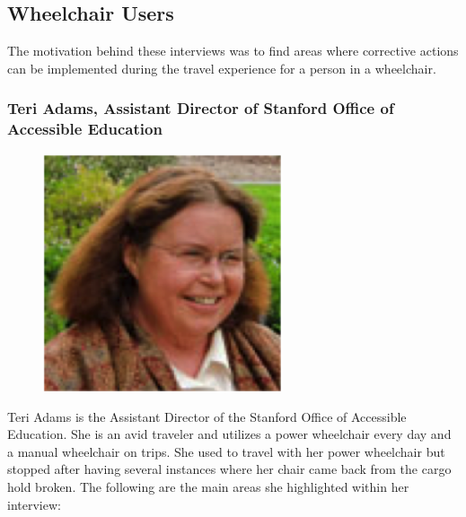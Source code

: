 \documentclass[a4paper, 12pt,conference]{new_cit_thesis}
\begin{document}
\subsection*{Wheelchair Users}
The motivation behind these interviews was to find areas where corrective actions can be implemented during the travel experience for a person in a wheelchair.

\subsubsection{Teri Adams, Assistant Director of Stanford Office of Accessible Education}
\begin{figure}[h]
  \centering
     \includegraphics[width=7cm]{images/image022}
  \label{fig:22}
\end{figure}

Teri Adams is the Assistant Director of the Stanford Office of Accessible Education.  She is an avid traveler and utilizes a power wheelchair every day and a manual wheelchair on trips. She used to travel with her power wheelchair but stopped after having several instances where her chair came back from the cargo hold broken. The following are the main areas she highlighted within her interview:
\end{document}
